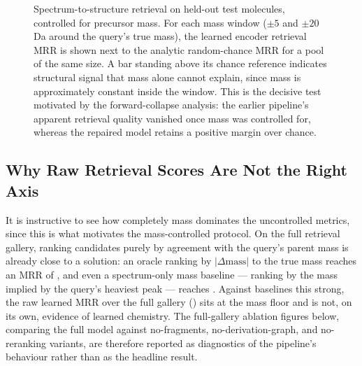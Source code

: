 \begin{figure}[H]
    \centering
    \caption[Mass-controlled retrieval: learned vs.\ chance]{
        Spectrum-to-structure retrieval on held-out test molecules, controlled for precursor mass.
        For each mass window ($\pm 5$ and $\pm 20$\,Da around the query's true mass), the learned encoder retrieval MRR is shown next to the analytic random-chance MRR for a pool of the same size.
        A bar standing above its chance reference indicates structural signal that mass alone cannot explain, since mass is approximately constant inside the window.
        This is the decisive test motivated by the forward-collapse analysis: the earlier pipeline's apparent retrieval quality vanished once mass was controlled for, whereas the repaired model retains a positive margin over chance.
    }
    \label{fig:mass-controlled}
\end{figure}

\subsection{Why Raw Retrieval Scores Are Not the Right Axis}
\label{sec:raw-scores}

It is instructive to see how completely mass dominates the uncontrolled metrics, since this is what motivates the mass-controlled protocol.
On the full retrieval gallery, ranking candidates purely by agreement with the query's parent mass is already close to a solution: an oracle ranking by $|\Delta\mathrm{mass}|$ to the true mass reaches an MRR of , and even a spectrum-only mass baseline --- ranking by the mass implied by the query's heaviest peak --- reaches .
Against baselines this strong, the raw learned MRR over the full gallery () sits at the mass floor and is not, on its own, evidence of learned chemistry.
The full-gallery ablation figures below, comparing the full model against no-fragments, no-derivation-graph, and no-reranking variants, are therefore reported as diagnostics of the pipeline's behaviour rather than as the headline result.

